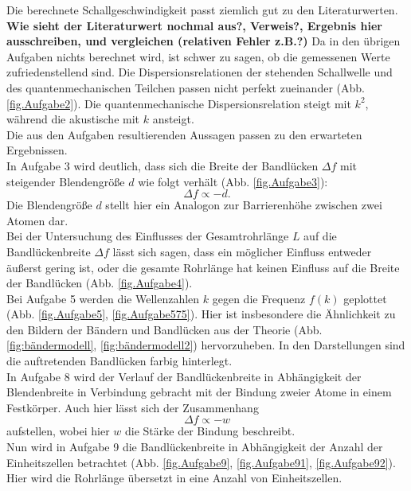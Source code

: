 Die berechnete Schallgeschwindigkeit passt ziemlich gut zu den Literaturwerten.
\textbf{\huge{Wie sieht der Literaturwert nochmal aus?, Verweis?, Ergebnis hier ausschreiben, und vergleichen (relativen Fehler z.B.?)}}
Da in den übrigen Aufgaben nichts berechnet wird, ist schwer zu sagen, ob die gemessenen Werte zufriedenstellend sind.
Die Dispersionsrelationen der stehenden Schallwelle und des quantenmechanischen Teilchen passen nicht perfekt zueinander (Abb. \ref{fig.Aufgabe2}).
Die quantenmechanische Dispersionsrelation steigt mit $k^2$, während die akustische mit $k$ ansteigt.\\
Die aus den Aufgaben resultierenden Aussagen passen zu den erwarteten Ergebnissen.
\\In Aufgabe 3 wird deutlich, dass sich die Breite der Bandlücken $\Delta f$ mit steigender Blendengröße $d$ wie folgt verhält (Abb. \ref{fig.Aufgabe3}):
\begin{equation*}
  \Delta f \propto - d.
\end{equation*}
Die Blendengröße $d$ stellt hier ein Analogon zur Barrierenhöhe zwischen zwei Atomen dar.
\\Bei der Untersuchung des Einflusses der Gesamtrohrlänge $L$ auf die Bandlückenbreite $\Delta f$ lässt sich sagen, dass ein möglicher Einfluss entweder äußerst gering ist, oder die gesamte Rohrlänge hat keinen Einfluss auf die Breite der Bandlücken (Abb. \ref{fig.Aufgabe4}).
\\Bei Aufgabe 5 werden die Wellenzahlen $k$ gegen die Frequenz $f(k)$ geplottet (Abb. \ref{fig.Aufgabe5}, \ref{fig.Aufgabe575}).
Hier ist insbesondere die Ähnlichkeit zu den Bildern der Bändern und Bandlücken aus der Theorie (Abb. \ref{fig:bändermodell}, \ref{fig:bändermodell2}) hervorzuheben.
In den Darstellungen sind die auftretenden Bandlücken farbig hinterlegt.
\\In Aufgabe 8 wird der Verlauf der Bandlückenbreite in Abhängigkeit der Blendenbreite in Verbindung gebracht mit der Bindung zweier Atome in einem Festkörper.
Auch hier lässt sich der Zusammenhang
\begin{equation*}
  \Delta f \propto - w
\end{equation*}
aufstellen, wobei hier $w$ die Stärke der Bindung beschreibt.
\\Nun wird in Aufgabe 9 die Bandlückenbreite in Abhängigkeit der Anzahl der Einheitszellen betrachtet (Abb. \ref{fig.Aufgabe9}, \ref{fig.Aufgabe91}, \ref{fig.Aufgabe92}).
Hier wird die Rohrlänge übersetzt in eine Anzahl von Einheitszellen.
